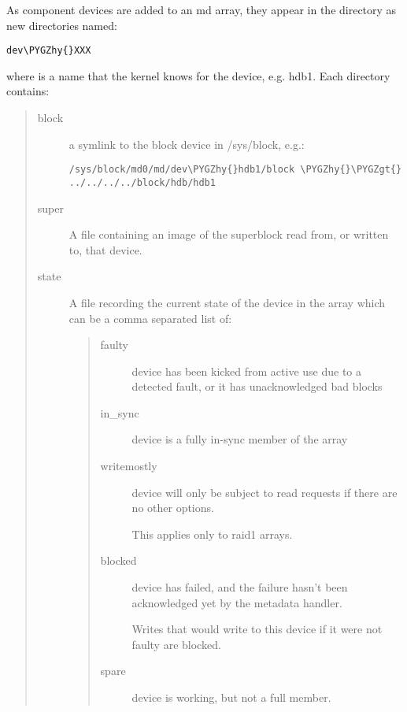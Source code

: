 \documentclass[a4paper,8pt,english]{sphinxmanual}
\def\PYGZgt{\char`\>}
\def\PYGZhy{\char`\-}
\begin{document}
As component devices are added to an md array, they appear in the 
directory as new directories named:

\begin{Verbatim}[commandchars=\\\{\}]
dev\PYGZhy{}XXX
\end{Verbatim}

where  is a name that the kernel knows for the device, e.g. hdb1.
Each directory contains:
\begin{quote}
\begin{description}
\item[{block}] \leavevmode
a symlink to the block device in /sys/block, e.g.:

\begin{Verbatim}[commandchars=\\\{\}]
/sys/block/md0/md/dev\PYGZhy{}hdb1/block \PYGZhy{}\PYGZgt{} ../../../../block/hdb/hdb1
\end{Verbatim}

\item[{super}] \leavevmode
A file containing an image of the superblock read from, or
written to, that device.

\item[{state}] \leavevmode
A file recording the current state of the device in the array
which can be a comma separated list of:
\begin{quote}
\begin{description}
\item[{faulty}] \leavevmode
device has been kicked from active use due to
a detected fault, or it has unacknowledged bad
blocks

\item[{in\_sync}] \leavevmode
device is a fully in-sync member of the array

\item[{writemostly}] \leavevmode
device will only be subject to read
requests if there are no other options.

This applies only to raid1 arrays.

\item[{blocked}] \leavevmode
device has failed, and the failure hasn't been
acknowledged yet by the metadata handler.

Writes that would write to this device if
it were not faulty are blocked.

\item[{spare}] \leavevmode
device is working, but not a full member.


\end{description}
\end{quote}
\end{description}
\end{quote}
\end{document}
